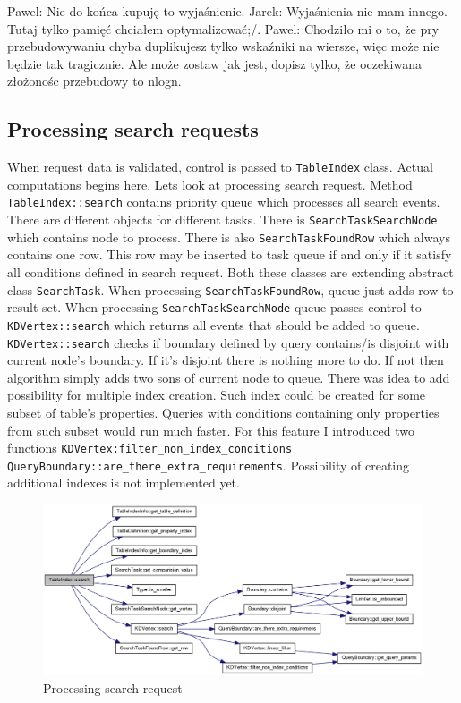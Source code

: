 \documentclass[10pt,a4paper]{article}
\newcommand{\pawel}[1]{\noindent\colorbox{myRed}{Pawel: #1}}
\newcommand{\jarek}[1]{\noindent\colorbox{myYellow}{Jarek: #1}}
\begin{document}
\pawel{Nie do końca kupuję to wyjaśnienie.}
\jarek{Wyjaśnienia nie mam innego. Tutaj tylko pamięć chciałem optymalizować;/. }
\pawel{Chodziło mi o to, że pry przebudowywaniu chyba duplikujesz tylko wskaźniki na wiersze, więc może nie będzie tak tragicznie. Ale może zostaw jak jest, dopisz tylko, że oczekiwana złożonośc przebudowy to nlogn.}

\subsection{Processing search requests}

When request data is validated, control is passed to \verb|TableIndex| class. Actual computations begins here. Lets look at processing search request. Method \verb|TableIndex::search| contains priority queue which processes all search events. There are different objects for different tasks. There is \verb|SearchTaskSearchNode| which contains node to process. There is also \verb|SearchTaskFoundRow| which always contains one row. This row may be inserted to task queue if and only if it satisfy all conditions defined in search request. Both these classes are extending abstract class \verb|SearchTask|. When processing \verb|SearchTaskFoundRow|, queue just adds row to result set. When processing \verb|SearchTaskSearchNode| queue passes control to \verb|KDVertex::search| which returns all events that should be added to queue. \verb|KDVertex::search| checks if boundary defined by query contains/is disjoint with current node's boundary. If it's disjoint there is nothing more to do. If not then algorithm simply adds two sons of current node to queue. There was idea to add possibility for multiple index creation. Such index could be created for some subset of table's properties. Queries with conditions containing only properties from such subset would run much faster. For this feature I introduced two functions \verb|KDVertex:filter_non_index_conditions| \verb|QueryBoundary::are_there_extra_requirements|. Possibility of creating additional indexes is not implemented yet.  

\begin{figure}
\centering
  \includegraphics[width=16cm]{search}
  \caption{Processing search request}
  \label{fig:search}
\end{figure}
\end{document}
